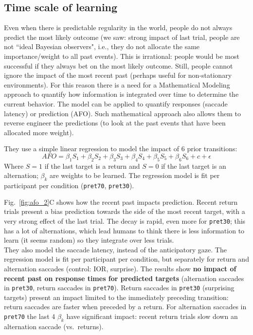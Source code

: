\subsection{Time scale of learning}
Even when there is predictable regularity in the world, people do not always predict the most likely outcome (we saw: strong impact of last trial, people are not ``ideal Bayesian observers", i.e., they do not allocate the same importance/weight to all past events). This is irrational: people would be most successful if they always bet on the most likely outcome. Still, people cannot ignore the impact of the most recent past (perhaps useful for non-stationary environments). For this reason there is a need for a Mathematical Modeling approach to quantify how information is integrated over time to determine the current behavior. The model can be applied to quantify responses (saccade latency) or prediction (AFO). Such mathematical approach also allows them to reverse engineer the predictions (to look at the past events that have been allocated more weight).

They use a simple linear regression to model the impact of 6 prior transitions:
\[
AFO = \beta_1S_1 + \beta_2S_2 + \beta_3S_3 + \beta_4S_4+ \beta_5S_5+ \beta_6S_6 + c + \epsilon
\]
Where $S=1$ if the last target is a return and $S=0$ if the last target is an alternation; $\beta_k$ are weights to be learned.  The regression model is fit per participant per condition (\texttt{pret70}, \texttt{pret30}).

Fig.~\ref{fig:afo_2}C shows how the recent past impacts prediction. Recent return trials present a bias prediction towards the side of the most recent target, with a very strong effect of the last trial. The decay is rapid, even more for \texttt{pret30}; this has a lot of alternations, which lead humans to think there is less information to learn (it seems random) so they integrate over less trials.\\

They also model the saccade latency, instead of the anticipatory gaze. The regression model is fit per participant per condition, but separately for return and alternation saccades (control: IOR, surprise). The results show \textbf{no impact of recent past on response times for predicted targets} (alternation saccades in \texttt{pret30}, return saccades in \texttt{pret70}). Return saccades in \texttt{pret30} (surprising targets) present an impact limited to the immediately preceding transition: return saccades are faster when preceded by a return. For alternation saccades in \texttt{pret70} the last 4 $\beta_k$ have significant impact: recent return trials slow down an alternation saccade (vs.~returns).\\

